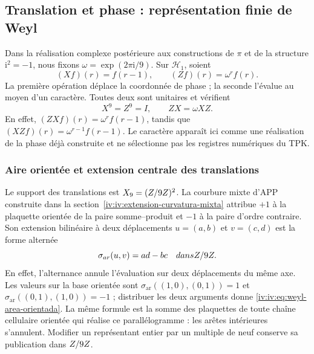 \subsection{Translation et phase : représentation finie de Weyl}

Dans la réalisation complexe postérieure aux constructions de \(\pi\) et de la structure \(\mathrm i^2=-1\), nous fixons \(\omega=\exp(2\pi\mathrm i/9)\). Sur \(\mathcal H_1\), soient
\begin{equation}
 (Xf)(r)=f(r-1),\qquad (Zf)(r)=\omega^r f(r).
 \label{iv:iv:eq:weyl-operadores}
\end{equation}
La première opération déplace la coordonnée de phase ; la seconde
l’évalue au moyen d’un caractère. Toutes deux sont unitaires et vérifient
\begin{equation}
 X^9=Z^9=I,\qquad ZX=\omega XZ.
 \label{iv:iv:eq:weyl-relacion}
\end{equation}
En effet, \((ZXf)(r)=\omega^r f(r-1)\), tandis que \((XZf)(r)=\omega^{r-1}f(r-1)\). Le caractère apparaît ici comme une réalisation de la phase déjà construite et ne sélectionne pas les registres numériques du TPK.

\subsubsection{Aire orientée et extension centrale des translations}
\label{iv:iv:weyl-area-extension}

Le support des translations est \(X_9=(Z/9Z)^2\).
La courbure mixte d’APP construite dans la
section~\ref{iv:iv:extension-curvatura-mixta} attribue \(+1\) à la
plaquette orientée de la paire somme--produit et \(-1\) à la
paire d’ordre contraire. Son extension bilinéaire à deux déplacements
\(u=(a,b)\) et \(v=(c,d)\) est la forme alternée
\begin{equation}
 \sigma_{\mathrm{ar}}(u,v)=ad-bc\quad\text{dans }\ZZ/9\ZZ.
 \label{iv:iv:eq:weyl-area-orientada}
\end{equation}
En effet, l’alternance annule l’évaluation sur deux déplacements
du même axe. Les valeurs sur la base orientée sont
\(\sigma_{\mathrm{ar}}((1,0),(0,1))=1\) et
\(\sigma_{\mathrm{ar}}((0,1),(1,0))=-1\) ; distribuer les deux
arguments donne \eqref{iv:iv:eq:weyl-area-orientada}. La même formule est
la somme des plaquettes de toute chaîne cellulaire orientée qui réalise
ce parallélogramme : les arêtes intérieures s’annulent. Modifier un
représentant entier par un multiple de neuf conserve sa publication
dans \(Z/9Z\).


